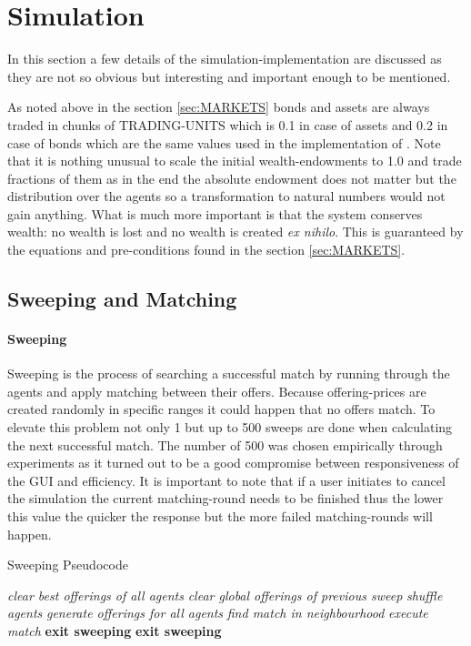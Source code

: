\documentclass[Bachelorarbeit.tex]{subfiles}
\begin{document}
\section{Simulation}
In this section a few details of the simulation-implementation are discussed as they are not so obvious but interesting and important enough to be mentioned.

\medskip

As noted above in the section \ref{sec:MARKETS} bonds and assets are always traded in chunks of TRADING-UNITS which is 0.1 in case of assets and 0.2 in case of bonds which are the same values used in the implementation of \cite{Breuer2015}. Note that it is nothing unusual to scale the initial wealth-endowments to 1.0 and trade fractions of them as in the end the absolute endowment does not matter but the distribution over the agents so a transformation to natural numbers would not gain anything. What is much more important is that the system conserves wealth: no wealth is lost and no wealth is created \textit{ex nihilo}. This is guaranteed by the equations and pre-conditions found in the section \ref{sec:MARKETS}. 

\subsection{Sweeping and Matching}
\label{sec:implementation_sweepingAndMatching}

\paragraph{Sweeping}
Sweeping is the process of searching a successful match by running through the agents and apply matching between their offers. Because offering-prices are created randomly in specific ranges it could happen that no offers match. To elevate this problem not only 1 but up to 500 sweeps are done when calculating the next successful match. The number of 500 was chosen empirically through experiments as it turned out to be a good compromise between responsiveness of the GUI and efficiency. It is important to note that if a user initiates to cancel the simulation the current matching-round needs to be finished thus the lower this value the quicker the response but the more failed matching-rounds will happen.

\begin{algorithm}
\caption{Sweeping Pseudocode}
\begin{algorithmic}[1]
\State \textit{clear best offerings of all agents}
	\State \textit{clear global offerings of previous sweep}
	\State \textit{shuffle agents}
	\State \textit{generate offerings for all agents}
		\State \textit{find match in neighbourhood}
			\State \textit{execute match}
			\State \textbf{exit sweeping}
		\EndIf 
	\EndFor
	\State \textbf{exit sweeping}
	\EndIf
\EndWhile
\end{algorithmic}
\end{algorithm}
\end{document}
